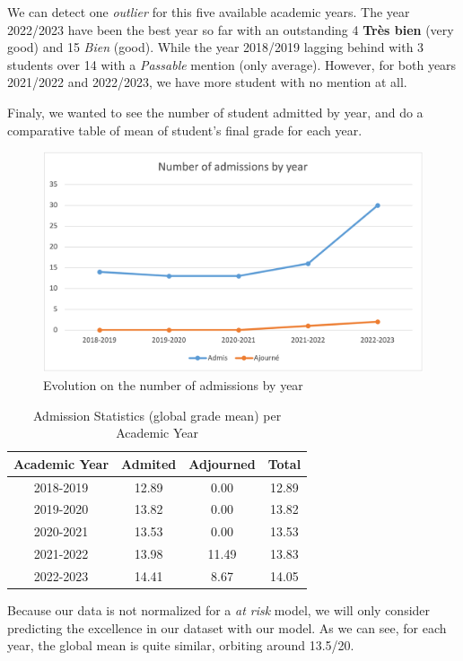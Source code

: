 \documentclass[../main.tex]{subfiles}
\begin{document}
We can detect one \textit{outlier} for this five available academic years. The year 2022/2023 have been the best year so far with an outstanding 4 \textbf{Très bien} (very good) and 15 \textit{Bien} (good). While the year 2018/2019 lagging behind with 3 students over 14 with a \textit{Passable} mention (only average). However, for both years 2021/2022 and 2022/2023, we have more student with no mention at all.

Finaly, we wanted to see the number of student admitted by year, and do a comparative table of mean of student's final grade for each year. 
\begin{figure}[H]      
    \includegraphics[width=1\linewidth]{res/graph/data_analysis/raw/nbadmissions_year.png}
    \caption{Evolution on the number of admissions by year}
    \label{fig:evol_nb_admis}
\end{figure}
\begin{table}[h]
  \centering
  \begin{tabular}{|c|c|c|c|}
    \hline
    Academic Year & Admited & Adjourned & Total \\
    \hline
    2018-2019 & 12.89 & 0.00 & 12.89 \\
    2019-2020 & 13.82 & 0.00 & 13.82 \\
    2020-2021 & 13.53 & 0.00 & 13.53 \\
    2021-2022 & 13.98 & 11.49 & 13.83 \\
    2022-2023 & 14.41 & 8.67 & 14.05 \\
    \hline
  \end{tabular}
  \caption{Admission Statistics (global grade mean) per Academic Year}
  \label{tab:admission_statistics}
\end{table}

Because our data is not normalized for a \textit{at risk} model, we will only consider predicting the excellence in our dataset with our model.
As we can see, for each year, the global mean is quite similar, orbiting around 13.5/20.
\end{document}
